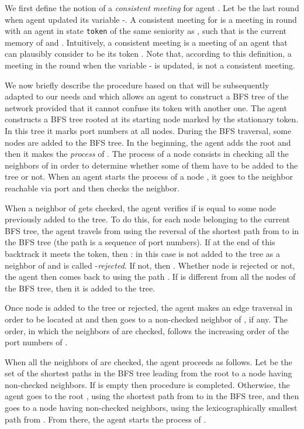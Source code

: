 \documentclass[11pt]{article}
\begin{document}
 We first define the notion of a {\em consistent meeting} for agent .
 Let  be the last round when agent  updated its variable -. 
 A consistent meeting for  is a meeting in round  with an agent  in state  {\tt token}
 of the same seniority as ,  such that  is the current memory of  and  . Intuitively, a consistent meeting is a meeting of
 an agent that  can plausibly consider to be its token . Note that, according to this definition, a meeting in the round when the variable - is updated,
 is not a consistent meeting.
 
 We now briefly describe the procedure  based on \cite{CDK} that will be subsequently adapted to our needs {and which allows an agent to construct a BFS tree of the network provided that it cannot confuse its token with another one.}
The agent constructs a BFS tree rooted at its starting node 
marked by the stationary token. In this tree it marks port numbers at all nodes. 
During the BFS traversal, some nodes are added to the BFS tree. {In the beginning, the agent adds the root  and then it makes the {\em process} of . The process of a node  consists in checking all the neighbors of  in order to determine whether 
some of them have to be added to the tree or not. When an agent starts the process of a node , it goes to the neighbor reachable via port  and then checks the neighbor.}

{When a neighbor  of  gets checked, the agent  
verifies if  is equal to some node
previously added to the tree. To do this, for each node  belonging to the current BFS tree, the agent travels from  using the reversal  of the shortest path  from  to  in the BFS tree (the path  is
a sequence of port numbers). If at the end of this backtrack it meets the token, then : in this case  is not added to the tree as a neighbor of  and is called -{\em rejected}. If not, then . Whether node  is rejected or not, the agent then comes back to  using the path . If  is different from all the nodes of the BFS tree, then it is added to the tree.}

{Once node  is added to the tree or rejected, the agent makes an edge traversal in order to be located at  and then goes to a non-checked neighbor of , if any. The order, in which the neighbors of  are checked, follows the increasing order of the port numbers of .} 

{When all the neighbors of  are checked, the agent proceeds as follows. Let  be the set of the shortest paths in the BFS tree leading from the root  to a node  having non-checked neighbors. If  is empty then procedure  is completed. Otherwise, the agent goes to the root , using the shortest path from  to  in the BFS tree, and then goes to a node  having non-checked neighbors, using the lexicographically smallest path from . From there, the agent starts the process of .}
\end{document}
